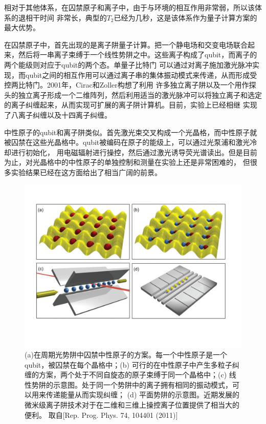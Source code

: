 相对于其他体系，在囚禁原子和离子中，由于与环境的相互作用非常弱，所以该体系的退相干时间
非常长，典型的$T_2$已经为几秒，这是该体系作为量子计算方案的最大优势。

 在囚禁原子中，首先出现的是离子阱量子计算。把一个静电场和交变电场联合起来，然后将一串离子束缚于一个线性势阱之中。这些离子构成了qubit，而离子的两个能级则对应于qubit的两个态。单量子比特门
 可以通过对离子施加激光脉冲实现，而qubit之间的相互作用可以通过离子串的集体振动模式来传递，从而形成受控两比特门\cite{ions1,ions2}。2001年，Cirac和Zoller\cite{ions3}构想了利用
 许多独立离子阱以及一个用作探头的独立离子形成一个二维阵列，然后利用适当的激光脉冲可以将独立离子和选定的离子纠缠起来，从而实现可扩展的离子阱计算机。目前，实验上已经相继
 实现了八离子纠缠\cite{ions4}以及十四离子纠缠\cite{ions5}。

 中性原子的qubit和离子阱类似。首先激光束交叉构成一个光晶格，而中性原子就被囚禁在这些光晶格中\cite{atoms1}。qubit被编码在原子的能级上，可以通过光泵浦和激光冷却进行初始化，
 用电磁辐射进行操控，然后通过激光诱导荧光谱读出。但是目前为止，对光晶格中的中性原子的单独控制和测量在实验上还是非常困难的，
 但很多实验结果已经在这方面给出了相当广阔的前景\cite{atoms2,atoms3,atoms4,atoms5,atoms6}。
\begin{figure}[htbp]
            \begin{center}
              \includegraphics[width= 0.8\columnwidth]{figures/trap.pdf}
              \caption{(a)在周期光势阱中囚禁中性原子的方案。每一个中性原子是一个qubit，被囚禁在每个晶格中；(b)  可行的在中性原子中产生多粒子纠缠的方案，两个处于不同自旋态的原子束缚于同一个晶格中；(c) 线性势阱的示意图。处于同一个势阱中的离子拥有相同的振动模式，可以用来传递能量从而实现纠缠； (d) 平面势阱的示意图。近期发展的微米级离子阱技术对于在二维和三维上操控离子位置提供了相当大的便利。 取自[Rep. Prog. Phys. 74, 104401 (2011)\cite{review2}]
              }
              \label{trap}
            \end{center}
  \end{figure}

